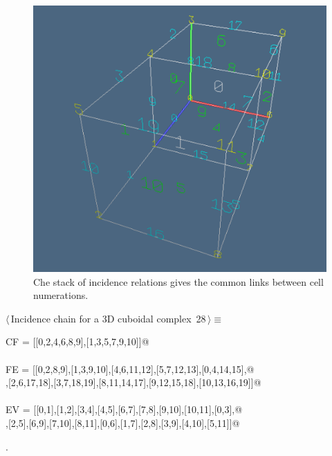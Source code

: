 \documentclass[11pt,oneside]{article}    %
\begin{document}
\begin{figure}[htbp] %
   \centering
   \includegraphics[width=0.5\linewidth]{images/incidenceChain} 
   \caption{Che stack of incidence relations gives the common links between cell numerations.}
   \label{incidenceChain}
\end{figure}


\begin{flushleft} \small \label{scrap46}
\protect{}$\langle\,$Incidence chain for a 3D cuboidal complex\nobreak\ {\footnotesize 28}$\,\rangle\equiv$
\vspace{-1ex}
\begin{list}{}{} \item
\mbox{}\verb@incidence CF = [[0,2,4,6,8,9],[1,3,5,7,9,10]]@\\
\mbox{}\verb@@\\
\mbox{}\verb@incidence FE = [[0,2,8,9],[1,3,9,10],[4,6,11,12],[5,7,12,13],[0,4,14,15],@\\
\mbox{}\verb@[1,5,15,16],[2,6,17,18],[3,7,18,19],[8,11,14,17],[9,12,15,18],[10,13,16,19]]@\\
\mbox{}\verb@@\\
\mbox{}\verb@incidence EV = [[0,1],[1,2],[3,4],[4,5],[6,7],[7,8],[9,10],[10,11],[0,3],@\\
\mbox{}\verb@[1,4],[2,5],[6,9],[7,10],[8,11],[0,6],[1,7],[2,8],[3,9],[4,10],[5,11]]@\\
\mbox{}\verb@@{\NWsep}
\end{list}
\vspace{-1ex}
\footnotesize\addtolength{\baselineskip}{-1ex}
\begin{list}{}{\setlength{\itemsep}{-\parsep}\setlength{\itemindent}{-\leftmargin}}
\item {\NWtxtMacroNoRef}.
\end{list}
\end{flushleft}
\end{document}
